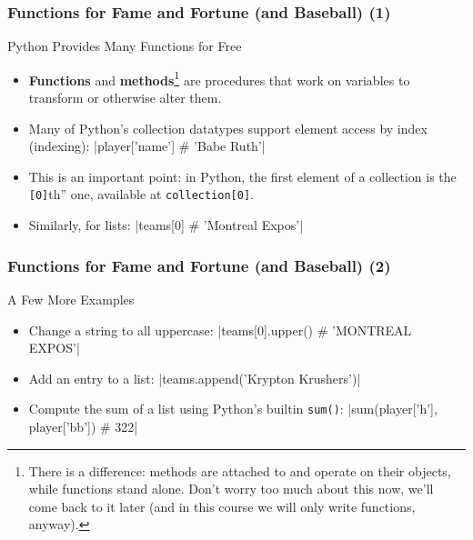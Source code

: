 \documentclass[10pt]{beamer}
\begin{document}
\begin{frame}[fragile]
  \frametitle{Functions for Fame and Fortune (and Baseball) (1)}
  \begin{block}{Python Provides Many Functions for Free}
    \begin{itemize}
      \item \textbf{Functions} and \textbf{methods}\footnote{There is a difference: methods are attached to and operate on their objects, while functions stand alone. Don't worry too much about this now, we'll come back to it later (and in this course we will only write functions, anyway).} are procedures that work on variables to transform or otherwise alter them.
      \item Many of Python's collection datatypes support element access by index (indexing):
        |player['name'] # 'Babe Ruth'|

      \item This is an important point: in Python, the first element of a collection is the \texttt{[0]}th'' one, available at \texttt{collection[0]}.
      \item Similarly, for lists:
        |teams[0] # 'Montreal Expos'|
    \end{itemize}
  \end{block}
\end{frame}

\begin{frame}[fragile]
  \frametitle{Functions for Fame and Fortune (and Baseball) (2)}
  \begin{block}{A Few More Examples}
    \begin{itemize}
      \item Change a string to all uppercase:
        |teams[0].upper() # 'MONTREAL EXPOS'|
      \item Add an entry to a list:
        |teams.append('Krypton Krushers')|
      \item Compute the sum of a list using Python's builtin \texttt{sum()}:
        |sum(player['h'], player['bb']) # 322|
    \end{itemize}
  \end{block}
\end{frame}
\end{document}

